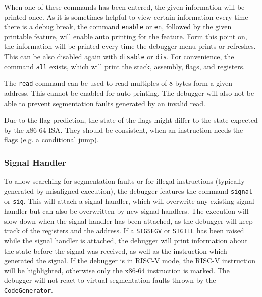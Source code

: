 		When one of these commands has been entered, the given information will be printed once. As it is sometimes helpful to view certain information every time there is a debug break, the command \texttt{enable} or \texttt{en}, followed by the given printable feature, will enable auto printing for the feature. Form this point on, the information will be printed every time the debugger menu prints or refreshes. This can be also disabled again with \texttt{disable} or \texttt{dis}. For convenience, the command \texttt{all} exists, which will print the stack, assembly, flags, and registers.
		
		The \texttt{read} command can be used to read multiples of 8 bytes form a given address. This cannot be enabled for auto printing. The debugger will also not be able to prevent segmentation faults generated by an invalid read.
	
		Due to the flag prediction, the state of the flags might differ to the state expected by the x86-64 ISA. They should be consistent, when an instruction needs the flags  (e.g. a conditional jump).
	
	\subsubsection{Signal Handler}
		To allow searching for segmentation faults or for illegal instructions (typically generated by misaligned execution), the debugger features the command \texttt{signal} or \texttt{sig}. This will attach a signal handler, which will overwrite any existing signal handler but can also be overwritten by new signal handlers. The execution will slow down when the signal handler has been attached, as the debugger will keep track of the registers and the address. If a \texttt{SIGSEGV} or \texttt{SIGILL} has been raised while the signal handler is attached, the debugger will print information about the state before the signal was received, as well as the instruction which generated the signal. If the debugger is in RISC-V mode, the RISC-V instruction will be highlighted, otherwise only the x86-64 instruction is marked. The debugger will not react to virtual segmentation faults thrown by the \texttt{CodeGenerator}.
		
